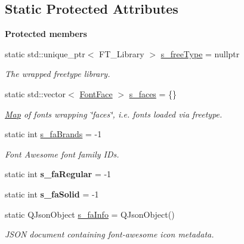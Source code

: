 \subsection*{Static Protected Attributes}
\begin{Indent}\textbf{ Protected members}\par
\begin{DoxyCompactItemize}
\item 
\mbox{\label{classrev_1_1_font_manager_a648a2697270594f09fb118bd78807096}} 
static std\+::unique\+\_\+ptr$<$ F\+T\+\_\+\+Library $>$ \mbox{\hyperlink{classrev_1_1_font_manager_a648a2697270594f09fb118bd78807096}{s\+\_\+free\+Type}} = nullptr
\begin{DoxyCompactList}\small\item\em The wrapped freetype library. \end{DoxyCompactList}\item 
\mbox{\label{classrev_1_1_font_manager_a031fd1b52dc0e848770ea7c7d3621d93}} 
static std\+::vector$<$ \mbox{\hyperlink{classrev_1_1_font_face}{Font\+Face}} $>$ \mbox{\hyperlink{classrev_1_1_font_manager_a031fd1b52dc0e848770ea7c7d3621d93}{s\+\_\+faces}} = \{\}
\begin{DoxyCompactList}\small\item\em \mbox{\hyperlink{classrev_1_1_map}{Map}} of fonts wrapping \char`\"{}faces\char`\"{}, i.\+e. fonts loaded via freetype. \end{DoxyCompactList}\item 
\mbox{\label{classrev_1_1_font_manager_a8ec9ffc0f00a46a44eea23d56bc14ac2}} 
static int \mbox{\hyperlink{classrev_1_1_font_manager_a8ec9ffc0f00a46a44eea23d56bc14ac2}{s\+\_\+fa\+Brands}} = -\/1
\begin{DoxyCompactList}\small\item\em Font Awesome font family I\+Ds. \end{DoxyCompactList}\item 
\mbox{\label{classrev_1_1_font_manager_a1e8c7432983b8ea6d432cafc34ff444a}} 
static int {\bfseries s\+\_\+fa\+Regular} = -\/1
\item 
\mbox{\label{classrev_1_1_font_manager_ac6262d59cda13bafc96e5fa463c239f1}} 
static int {\bfseries s\+\_\+fa\+Solid} = -\/1
\item 
\mbox{\label{classrev_1_1_font_manager_abc1449bc1afb6447b449024ac9fad7af}} 
static Q\+Json\+Object \mbox{\hyperlink{classrev_1_1_font_manager_abc1449bc1afb6447b449024ac9fad7af}{s\+\_\+fa\+Info}} = Q\+Json\+Object()
\begin{DoxyCompactList}\small\item\em J\+S\+ON document containing font-\/awesome icon metadata. \end{DoxyCompactList}\end{DoxyCompactItemize}
\end{Indent}
